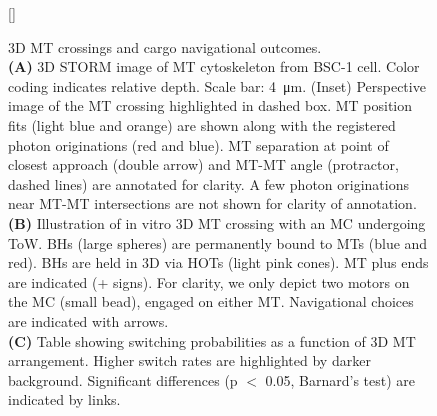 \begin{figure}
[\FBwidth]
{\caption[3D MT crossings and cargo navigational outcomes]{3D MT crossings and cargo navigational outcomes.\\
\textbf{(A)} 3D STORM image of MT cytoskeleton from BSC-1 cell. Color coding indicates relative depth. Scale bar: \SI{4}{\micro\meter}. (Inset) Perspective image of the MT crossing highlighted in dashed box. MT position fits (light blue and orange) are shown along with the registered photon originations (red and blue). MT separation at point of closest approach (double arrow) and MT-MT angle (protractor, dashed lines) are annotated for clarity. A few photon originations near MT-MT intersections are not shown for clarity of annotation.\\
\textbf{(B)} Illustration of in vitro 3D MT crossing with an MC undergoing ToW. BHs (large spheres) are permanently bound to MTs (blue and red). BHs are held in 3D via HOTs (light pink cones). MT plus ends are indicated (+ signs). For clarity, we only depict two motors on the MC (small bead), engaged on either MT. Navigational choices are indicated with arrows.\\
\textbf{(C)} Table showing switching probabilities as a function of 3D MT arrangement. Higher switch rates are highlighted by darker background. Significant differences (p $<$ 0.05, Barnard's test) are indicated by links.}\label{fig:1}}

\end{figure}
